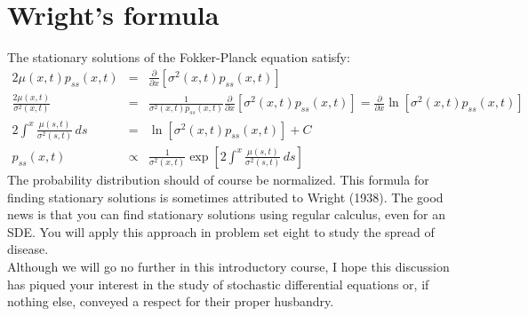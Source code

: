 \documentclass{article}
\begin{document}
 \section*{Wright's formula}
The stationary solutions of the Fokker-Planck equation satisfy:
\begin{eqnarray*}
2 \mu(x,t) p_{ss}(x,t) & = & \frac{\partial }{\partial x} \left[ \sigma^2(x,t) p_{ss}(x,t) \right]\\
\frac{2 \mu(x,t)}{\sigma^2(x,t)} & = & \frac{1}{\sigma^2(x,t) p_{ss}(x,t)} \frac{\partial }{\partial x} \left[ \sigma^2(x,t) p_{ss}(x,t) \right] = \frac{\partial}{\partial x} \ln \left[ \sigma^2(x,t) p_{ss}(x,t) \right]\\
2\int^x \frac{\mu(s,t)}{\sigma^2(s,t)} \, ds & = & \ln  \left[ \sigma^2(x,t) p_{ss}(x,t) \right] + C\\
p_{ss}(x,t) & \propto & \frac{1}{\sigma^2(x,t)} \exp \left[ 2\int^x \frac{\mu(s,t)}{\sigma^2(s,t)} \, ds \right]
\end{eqnarray*}
The probability distribution should of course be normalized. This formula for finding stationary solutions is sometimes attributed to Wright (1938). The good news is that you can find stationary solutions using regular calculus, even for an SDE. You will apply this approach in problem set eight to study the spread of disease.\\

Although we will go no further in this introductory course, I hope this discussion has piqued your interest in the study of stochastic differential equations or, if nothing else, conveyed a respect for their proper husbandry.
\end{document}
